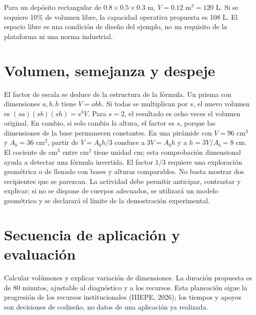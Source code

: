 \documentclass[spanish,letterpaper,oneside]{article}
\begin{document}
Para un depósito rectangular de $0.8\times0.5\times0.3$ m, $V=0.12$ m$^3=120$ L. Si se requiere 10\% de volumen libre, la capacidad operativa propuesta es 108 L. El espacio libre es una condición de diseño del ejemplo, no un requisito de la plataforma ni una norma industrial.
\section{Volumen, semejanza y despeje}
El factor de escala se deduce de la estructura de la fórmula. Un prisma con dimensiones $a,b,h$ tiene $V=abh$. Si todas se multiplican por $s$, el nuevo volumen es $(sa)(sb)(sh)=s^3V$. Para $s=2$, el resultado es ocho veces el volumen original. En cambio, si solo cambia la altura, el factor es $s$, porque las dimensiones de la base permanecen constantes.
En una pirámide con $V=96$ cm$^3$ y $A_b=36$ cm$^2$, partir de $V=A_bh/3$ conduce a $3V=A_bh$ y a $h=3V/A_b=8$ cm. El cociente de cm$^3$ entre cm$^2$ tiene unidad cm; esta comprobación dimensional ayuda a detectar una fórmula invertida.
El factor $1/3$ requiere una exploración geométrica o de llenado con bases y alturas comparables. No basta mostrar dos recipientes que se parezcan. La actividad debe permitir anticipar, contrastar y explicar; si no se dispone de cuerpos adecuados, se utilizará un modelo geométrico y se declarará el límite de la demostración experimental.
\section{Secuencia de aplicación y evaluación}
Calcular volúmenes y explicar variación de dimensiones. La duración propuesta es de 80 minutos, ajustable al diagnóstico y a los recursos. Esta planeación sigue la progresión de los recursos institucionales (IIIEPE, 2026); los tiempos y apoyos son decisiones de codiseño, no datos de una aplicación ya realizada.
\end{document}
